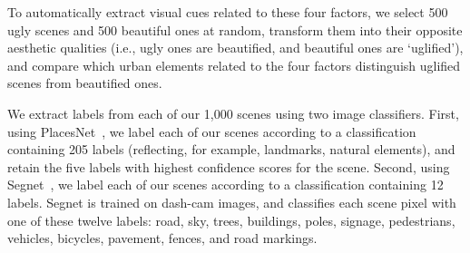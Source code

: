 \begin{table}[h]
    \centering
    
    \caption{Urban Design Metrics}
    \label{tab:Design_metrics}
\end{table}


To automatically extract visual cues related to these four factors, we select 500 ugly scenes and 500 beautiful ones at random, transform them into their opposite aesthetic qualities (i.e., ugly ones are beautified, and beautiful ones are `uglified'), and compare which urban elements related to the four factors distinguish uglified scenes from beautified ones. 

We extract labels from each of our 1,000 scenes using two image classifiers. First, using PlacesNet~\cite{zhou2014learning}, we label each of our scenes according to a classification containing 205 labels (reflecting, for example, landmarks, natural elements), and retain the five labels with highest confidence scores for the scene. Second, using Segnet~\cite{badrinarayanan2015segnet}, we  label each of our scenes according to a classification containing 12 labels. Segnet is trained on dash-cam images, and classifies each scene pixel with one of these twelve labels: road, sky, trees,  buildings, poles, signage, pedestrians, vehicles, bicycles, pavement, fences, and road markings. 

